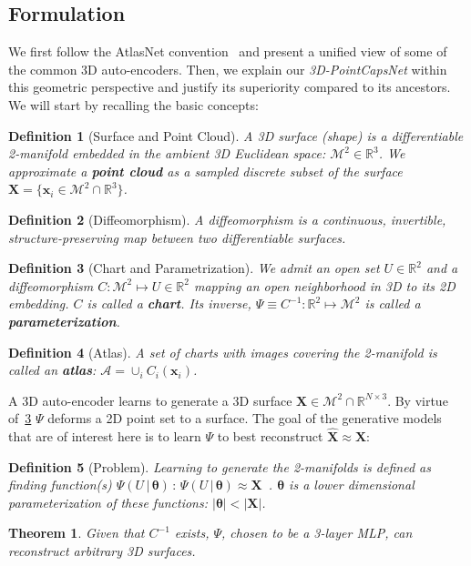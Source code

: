 \documentclass[10pt,twocolumn,letterpaper]{article}
\theoremstyle{break}
\newcommand{\x}{\mathbf{x}}
\newcommand{\X}{\mathbf{X}}
\newcommand{\R}{\mathbb{R}}
\newcommand{\M}{\mathcal{M}}
\newtheorem{thm}{Theorem}
\newtheorem{dfn}{Definition}
\begin{document}
\subsection{Formulation}
We first follow the AtlasNet convention~\cite{groueix2018} and present a unified view of some of the common 3D auto-encoders. Then, we explain our \textit{3D-PointCapsNet} within this geometric perspective and justify its superiority compared to its ancestors. We will start by recalling the basic concepts:
\begin{dfn}[Surface and Point Cloud]
\label{dfn:surface}
A 3D surface (\textit{shape}) is a differentiable 2-manifold embedded in the ambient 3D Euclidean space: $\M^2\in \R^3$. We approximate a \textbf{point cloud} as a sampled discrete subset of the surface $\X=\{\x_i \in \M^2 \cap \R^3\}$.
\end{dfn}
\begin{dfn}[Diffeomorphism]
\label{dfn:diff}
A diffeomorphism is a continuous, invertible, structure-preserving map between two differentiable surfaces.
\end{dfn}
\begin{dfn}[Chart and Parametrization]
\label{dfn:chart}
We admit an open set $U\in\R^2$ and a diffeomorphism $C: \M^2 \mapsto U\in \R^2$ mapping an open neighborhood in 3D to its 2D embedding. $C$ is called a \textbf{chart}. Its inverse, $\Psi \equiv C^{-1}: \R^2\mapsto \M^2$ is called a \textbf{parameterization}.
\end{dfn}
\begin{dfn}[Atlas]
\label{dfn:atlas}
A set of charts with images covering the 2-manifold is called an \textbf{atlas}: $\mathcal{A}=\cup_i C_i(\x_i)$.
\end{dfn}
\noindent A 3D auto-encoder learns to generate a 3D surface $\X \in \M^2 \cap \R^{N \times 3}$. By virtue of~\cref{dfn:chart} $\Psi$ deforms a 2D point set to a surface. The goal of the generative models that are of interest here is to learn $\Psi$ to best reconstruct $\hat{\X}\approx\X$:
\begin{dfn}[Problem]
\label{dfn:problem}
Learning to generate the 2-manifolds is defined as finding function(s) $\Psi(U\,|\,\bm{\theta})\,:\, \Psi(U\,|\,\bm{\theta})\approx \X$~\cite{groueix2018}. $\bm{\theta}$ is a lower dimensional parameterization of these functions: $|\bm{\theta}|<|\X|$.
\end{dfn}
\begin{thm}
\label{thm:folding}
Given that $C^{-1}$ exists, $\Psi$, chosen to be a 3-layer MLP, can reconstruct arbitrary 3D surfaces.
\end{thm}
\end{document}
